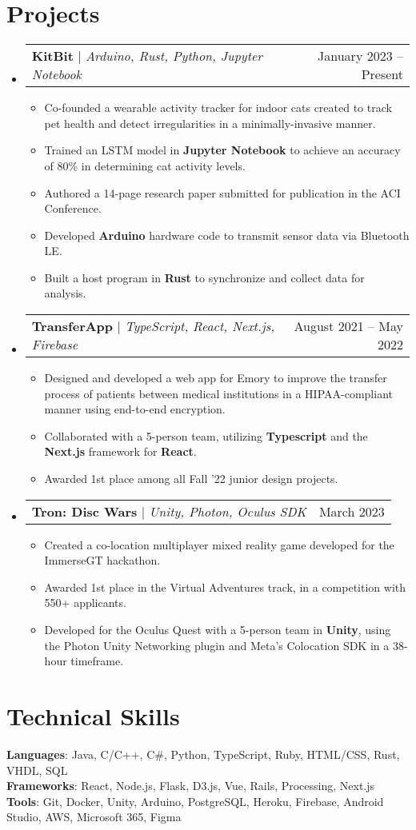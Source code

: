 \documentclass[letterpaper,11pt]{article}
\makeatletter
\newcommand{\resumeItem}[1]{
  \item\small{
    {#1 \vspace{-2pt}}
  }
}
\newcommand{\resumeProjectHeading}[2]{
    \item
    \begin{tabular*}{0.97\textwidth}{l@{\extracolsep{\fill}}r}
      \small#1 & #2 \\
    \end{tabular*}\vspace{-7pt}
}
\newcommand{\resumeSubHeadingListStart}{\begin{itemize}[leftmargin=0.15in, label={}]}
\newcommand{\resumeSubHeadingListEnd}{\end{itemize}}
\newcommand{\resumeItemListStart}{\begin{itemize}}
\newcommand{\resumeItemListEnd}{\end{itemize}\vspace{-5pt}}
\makeatother
\begin{document}
\section{Projects}
    \resumeSubHeadingListStart
    \resumeProjectHeading
          {\textbf{KitBit} $|$ \emph{Arduino, Rust, Python, Jupyter Notebook}}{January 2023 -- Present}
          \resumeItemListStart
                      \resumeItem{Co-founded a wearable activity tracker for indoor cats created to track pet health and detect irregularities in a minimally-invasive manner.}
                        \resumeItem{Trained an LSTM model in \textbf{Jupyter Notebook} to achieve an accuracy of 80\% in determining cat activity levels.}
            \resumeItem{Authored a 14-page research paper submitted for publication in the ACI Conference.}
            \resumeItem{Developed \textbf{Arduino} hardware code to transmit sensor data via Bluetooth LE.}
            \resumeItem{Built a host program in \textbf{Rust} to synchronize and collect data for analysis.}
          \resumeItemListEnd
      \resumeProjectHeading
          {\textbf{TransferApp} $|$ \emph{TypeScript, React, Next.js, Firebase}}{August 2021 -- May 2022}
          \resumeItemListStart
            \resumeItem{Designed and developed a web app for Emory to improve the transfer process of patients between medical institutions in a HIPAA-compliant manner using end-to-end encryption.}
                        \resumeItem{Collaborated with a 5-person team, utilizing \textbf{Typescript} and the \textbf{Next.js} framework for \textbf{React}.}
            \resumeItem{Awarded 1st place among all Fall ’22 junior design projects.}
          \resumeItemListEnd
      \resumeProjectHeading
          {\textbf{Tron: Disc Wars} $|$ \emph{Unity, Photon, Oculus SDK}}{March 2023}
          \resumeItemListStart
            \resumeItem{Created a co-location multiplayer mixed reality game developed for the ImmerseGT hackathon.}
                        \resumeItem{Awarded 1st place in the Virtual Adventures track, in a competition with 550+ applicants.}
                        \resumeItem{Developed for the Oculus Quest with a 5-person team in \textbf{Unity}, using the Photon Unity
Networking plugin and Meta’s Colocation SDK in a 38-hour timeframe.}
          \resumeItemListEnd
    \resumeSubHeadingListEnd



%
\section{Technical Skills}
 \begin{itemize}[leftmargin=0.15in, label={}]
    \small{\item{
     \textbf{Languages}{: Java, C/C++, C\#, Python, TypeScript, Ruby, HTML/CSS, Rust, VHDL, SQL} \\
     \textbf{Frameworks}{: React, Node.js, Flask, D3.js, Vue, Rails, Processing, Next.js} \\
     \textbf{Tools}{: Git, Docker, Unity, Arduino, PostgreSQL, Heroku, Firebase, Android Studio, AWS, Microsoft 365, Figma} \\
    }}
 \end{itemize}


\end{document}
